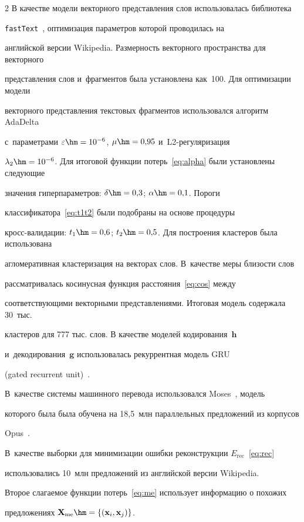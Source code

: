 \begin{multicols}{2}
В качестве модели векторного представления слов использовалась библиотека 


\texttt{fastText}~\cite{ft}, оптимизация параметров которой проводилась на 


английской версии Wikipedia. Размерность векторного пространства для векторного 


представления слов и~фрагментов была установлена как~100. Для оптимизации модели 


векторного представления текстовых фрагментов использовался алгоритм AdaDelta 


с~параметрами $\varepsilon\hm=10^{-6}$, $\mu\hm=0{,}95$ и~L2-ре\-гу\-ля\-ри\-за\-ция 


$\lambda_2\hm=10^{-6}$. Для итоговой  функции потерь~\eqref{eq:alpha} были установлены следующие 


значения гиперпараметров: $\delta\hm=0{,}3$; $\alpha\hm=0{,}1$. Пороги 


классификатора~\eqref{eq:t1t2} были подобраны на основе процедуры 


кросс-ва\-ли\-да\-ции: $t_1\hm=0{,}6$; $t_2\hm=0{,}5$. Для построения кластеров была использована 


агломеративная кластеризация на векторах слов. В~качестве меры близости слов 


рассматривалась косинусная  функция расстояния~\eqref{eq:cos} между 


соответствующими векторными представлениями. Итоговая модель содержала 30~тыс.\ 


кластеров для 777 тыс. слов. В качестве моделей кодирования~$\mathbf{h}$ 


и~декодирования~${\mathbf{g}}$ использовалась рекуррентная модель GRU


(gated recurrent unit)~\cite{gru}.


В~качестве системы машинного перевода использовался Moses~\cite{moses}, модель 


которого была была обучена на 18,5~млн параллельных предложений из корпусов 


Opus~\cite{opus}.


В~качестве выборки для минимизации ошибки реконструкции $E_{\mathrm{rec}}$~\eqref{eq:rec} 


использовались 10~млн предложений из английской версии Wikipedia.


Второе слагаемое функции потерь~\eqref{eq:me} использует информацию о похожих 


предложениях $\mathbf{X}_{\mathrm{me}}\hm = \{(\mathbf{x}_i, \mathbf{x}_j)\}$. 



\end{multicols}
